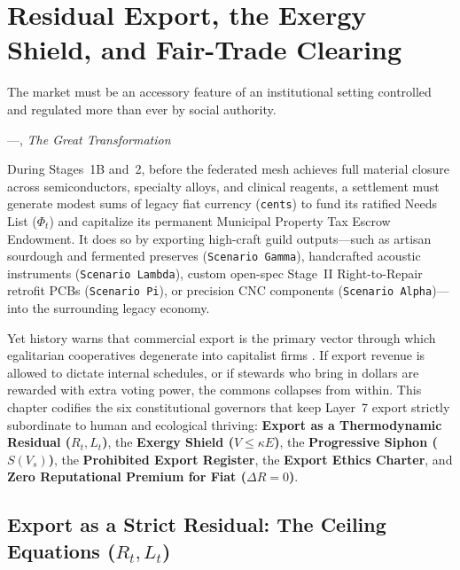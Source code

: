 \chapter{Residual Export, the Exergy Shield, and Fair-Trade Clearing}
\label{ch:l7-export-surplus-clearing}

\epigraph{The market must be an accessory feature of an institutional setting controlled and regulated more than ever by social authority.}{---\textcite{polanyi1944great}, \textit{The Great Transformation}}

During Stages~1B and~2, before the federated mesh achieves full material closure across semiconductors, specialty alloys, and clinical reagents, a settlement must generate modest sums of legacy fiat currency (\texttt{cents}) to fund its ratified Needs List ($\Phi_t$) and capitalize its permanent Municipal Property Tax Escrow Endowment. It does so by exporting high-craft guild outputs---such as artisan sourdough and fermented preserves (\texttt{Scenario Gamma}), handcrafted acoustic instruments (\texttt{Scenario Lambda}), custom open-spec Stage~II Right-to-Repair retrofit PCBs (\texttt{Scenario Pi}), or precision CNC components (\texttt{Scenario Alpha})---into the surrounding legacy economy.

Yet history warns that commercial export is the primary vector through which egalitarian cooperatives degenerate into capitalist firms \parencite{cornforth1995}. If export revenue is allowed to dictate internal schedules, or if stewards who bring in dollars are rewarded with extra voting power, the commons collapses from within. This chapter codifies the six constitutional governors that keep Layer~7 export strictly subordinate to human and ecological thriving: \textbf{Export as a Thermodynamic Residual ($R_t, L_t$)}, the \textbf{Exergy Shield ($V \le \kappa E$)}, the \textbf{Progressive Siphon ($S(V_s)$)}, the \textbf{Prohibited Export Register}, the \textbf{Export Ethics Charter}, and \textbf{Zero Reputational Premium for Fiat ($\Delta R = 0$)}.

\section{Export as a Strict Residual: The Ceiling Equations ($R_t, L_t$)}
\label{sec:l7-residual-equations}

